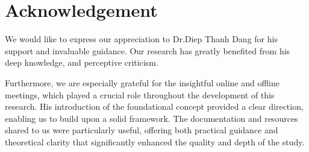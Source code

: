 \section*{\Huge Acknowledgement}
We would like to express our appreciation to Dr.Diep Thanh Dang for his support and invaluable guidance. Our research has greatly benefited from his deep knowledge, and perceptive criticism.

Furthermore, we are especially grateful for the insightful online and offline meetings, which played a crucial role throughout the development of this research. His introduction of the foundational concept provided a clear direction, enabling us to build upon a solid framework. The documentation and resources shared to us were particularly useful, offering both practical guidance and theoretical clarity that significantly enhanced the quality and depth of the study.
